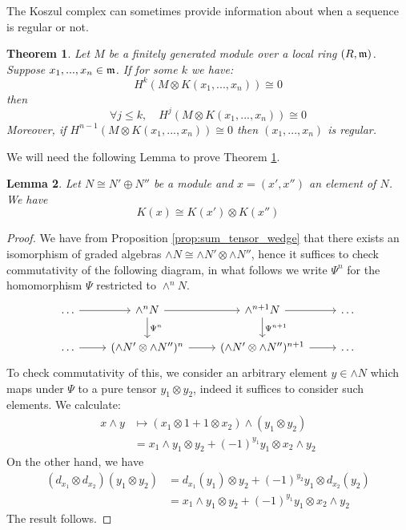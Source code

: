 \documentclass[12pt]{article}
\theoremstyle{plain}
\newtheorem{thm}{Theorem}[subsection] %
\newtheorem{lemma}[thm]{Lemma}
\theoremstyle{definition}
\begin{document}
The Koszul complex can sometimes provide information about when a sequence is regular or not.
\begin{thm}\label{thm:exact_reg}
Let $M$ be a finitely generated module over a local ring $(R,\frak{m})$. Suppose $x_1,...,x_n \in \frak{m}$. If for some $k$ we have:
\begin{equation}
    H^k(M \otimes K(x_1,...,x_n)) \cong 0
\end{equation}
then
\begin{equation}
    \forall j \leq k,\quad H^j(M \otimes K(x_1,...,x_n)) \cong 0
\end{equation}
Moreover, if $H^{n-1}(M \otimes K(x_1,...,x_n)) \cong 0$ then $(x_1,...,x_n)$ is regular.
\end{thm}
We will need the following Lemma to prove Theorem \ref{thm:exact_reg}.
\begin{lemma}\label{lem:sum_tens}
Let $N \cong N' \oplus N''$ be a module and $x = (x',x'')$ an element of $N$. We have
\begin{equation}
K(x) \cong K(x') \otimes K(x'')
\end{equation}
\end{lemma}
\begin{proof}
We have from Proposition \ref{prop:sum_tensor_wedge} that there exists an isomorphism of graded algebras $\wedge N \cong \wedge N' \otimes \wedge N''$, hence it suffices to check commutativity of the following diagram, in what follows we write $\Psi^n$ for the homomorphism $\Psi$ restricted to $\wedge^n N$.
\begin{equation}
    \begin{tikzcd}
    \hdots\arrow[r] & \wedge^n N\arrow[r]\arrow[d,"{\Psi^n}"] & \wedge^{n+1} N\arrow[r]\arrow[d,"{\Psi^{n+1}}"] & \hdots\\
    \hdots\arrow[r] & (\wedge N' \otimes \wedge N'')^{n}\arrow[r] & (\wedge N' \otimes \wedge N'')^{n+1}\arrow[r] & \hdots 
    \end{tikzcd}
\end{equation}
To check commutativity of this, we consider an arbitrary element $y \in \wedge N$ which maps under $\Psi$ to a pure tensor $y_1 \otimes y_2$, indeed it suffices to consider such elements. We calculate:
\begin{align*}
x \wedge y &\longmapsto (x_1 \otimes 1 + 1 \otimes x_2) \wedge (y_1 \otimes y_2)\\
&= x_1 \wedge y_1 \otimes y_2 + (-1)^{y_1}y_1 \otimes x_2 \wedge y_2
\end{align*}
On the other hand, we have
\begin{align*}
(d_{x_1} \otimes d_{x_2})(y_1 \otimes y_2) &= d_{x_1}(y_1) \otimes y_2 + (-1)^{y_2}y_1 \otimes d_{x_2}(y_2)\\
&= x_1 \wedge y_1 \otimes y_2 + (-1)^{y_1}y_1 \otimes x_2 \wedge y_2
\end{align*}
The result follows.
\end{proof}
\end{document}

